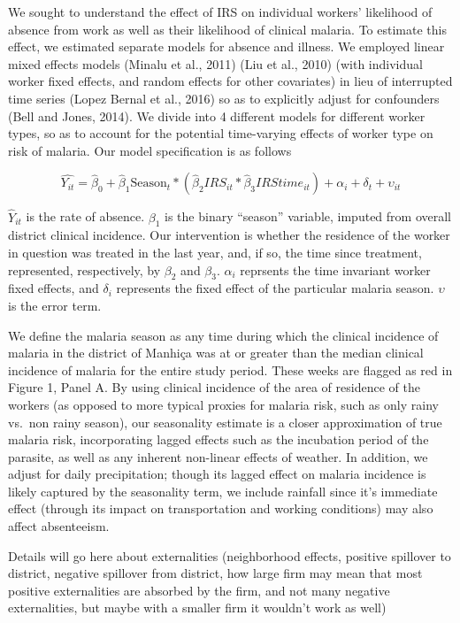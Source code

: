 \documentclass[]{article}
\begin{document}
We sought to understand the effect of IRS on individual workers'
likelihood of absence from work as well as their likelihood of clinical
malaria. To estimate this effect, we estimated separate models for
absence and illness. We employed linear mixed effects models (Minalu et
al., 2011) (Liu et al., 2010) (with individual worker fixed effects, and
random effects for other covariates) in lieu of interrupted time series
(Lopez Bernal et al., 2016) so as to explicitly adjust for confounders
(Bell and Jones, 2014). We divide into 4 different models for different
worker types, so as to account for the potential time-varying effects of
worker type on risk of malaria. Our model specification is as follows

\[
\hat{Y_{it}} = \hat{\beta}_{0} +  \hat{\beta}_{1}\text{Season}_{t} * (\hat{\beta}_2{IRS_{it}}*\hat{\beta}_3{IRStime_{it}}) + \alpha_i + \delta_t + \upsilon_{it}
\]

\(\hat{Y}_{it}\) is the rate of absence. \(\beta_{1}\) is the binary
``season'' variable, imputed from overall district clinical incidence.
Our intervention is whether the residence of the worker in question was
treated in the last year, and, if so, the time since treatment,
represented, respectively, by \(\beta_{2}\) and \(\beta_{3}\).
\(\alpha_i\) reprsents the time invariant worker fixed effects, and
\(\delta_i\) represents the fixed effect of the particular malaria
season. \(\upsilon\) is the error term.

We define the malaria season as any time during which the clinical
incidence of malaria in the district of Manhiça was at or greater than
the median clinical incidence of malaria for the entire study period.
These weeks are flagged as red in Figure 1, Panel A. By using clinical
incidence of the area of residence of the workers (as opposed to more
typical proxies for malaria risk, such as only rainy vs.~non rainy
season), our seasonality estimate is a closer approximation of true
malaria risk, incorporating lagged effects such as the incubation period
of the parasite, as well as any inherent non-linear effects of weather.
In addition, we adjust for daily precipitation; though its lagged effect
on malaria incidence is likely captured by the seasonality term, we
include rainfall since it's immediate effect (through its impact on
transportation and working conditions) may also affect absenteeism.

Details will go here about externalities (neighborhood effects, positive
spillover to district, negative spillover from district, how large firm
may mean that most positive externalities are absorbed by the firm, and
not many negative externalities, but maybe with a smaller firm it
wouldn't work as well)
\end{document}
